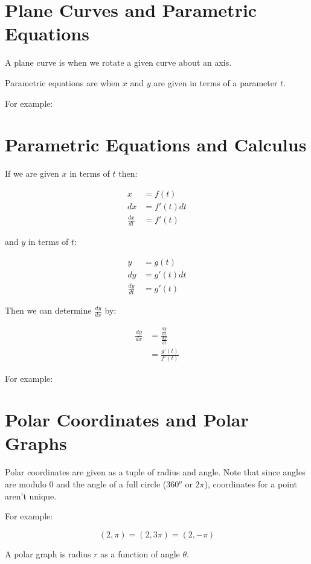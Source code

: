\documentclass{article}
\begin{document}
\section{Plane Curves and Parametric Equations}

A plane curve is when we rotate a given curve about an axis.

Parametric equations are when $x$ and $y$ are given in terms of a parameter $t$.

For example:

\section{Parametric Equations and Calculus}

If we are given $x$ in terms of $t$ then:

\begin{align*}
  x &= f(t) \\
  dx &= f'(t)dt \\
  \frac{dx}{dt} &= f'(t)
\end{align*}

and $y$ in terms of $t$:

\begin{align*}
  y &= g(t) \\
  dy &= g'(t)dt \\
  \frac{dy}{dt} &= g'(t)
\end{align*}

Then we can determine $\frac{dy}{dx}$ by:

\begin{align*}
  \frac{dy}{dx} &= \frac{ \frac{dy}{dt} }{ \frac{dx}{dt} } \\
  &= \frac{g'(t)}{f'(t)}
\end{align*}

For example:

\section{Polar Coordinates and Polar Graphs}

Polar coordinates are given as a tuple of radius and angle.  Note that
since angles are modulo 0 and the angle of a full circle ($360^o$ or
$2\pi$), coordinates for a point aren't unique.

For example:

\[
(2,\pi) = (2,3\pi) = (2,-\pi)
\]

A polar graph is radius $r$ as a function of angle $\theta$.
\end{document}

